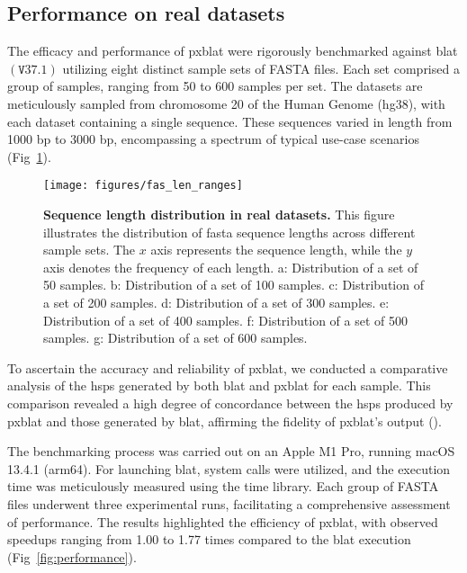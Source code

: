 \documentclass[10pt,letterpaper]{article}
\begin{document}
\subsection*{Performance on real datasets}

The efficacy and performance of \gls{pxblat} were rigorously benchmarked against \gls{blat} \(\left(\mathtt{V}37.1\right)\) utilizing eight distinct sample sets of FASTA files.
Each set comprised a group of samples, ranging from 50 to 600 samples per set.
The datasets are meticulously sampled from chromosome 20 of the Human Genome (hg38), with each dataset containing a single sequence.
These sequences varied in length from \num{1000} bp to \num{3000} bp, encompassing a spectrum of typical use-case scenarios (Fig~\ref{fig:fas_len}).

\begin{figure}[!h]
	\caption{{\bf Sequence length distribution in real datasets.} This figure illustrates the distribution of fasta sequence lengths across different sample sets. The \(x\) axis represents the sequence length, while the \(y\) axis denotes the frequency of each length.
        a: Distribution of a set of \num{50} samples.
        b: Distribution of a set of \num{100} samples.
        c: Distribution of a set of \num{200} samples.
        d: Distribution of a set of \num{300} samples.
        e: Distribution of a set of \num{400} samples.
        f: Distribution of a set of \num{500} samples.
        g: Distribution of a set of \num{600} samples.
        }
	\texttt{[image: figures/fas\_len\_ranges]}
	\label{fig:fas_len}
\end{figure}

To ascertain the accuracy and reliability of \gls{pxblat}, we conducted a comparative analysis of the \glspl{hsp} generated by both \gls{blat} and \gls{pxblat} for each sample.
This comparison revealed a high degree of concordance between the \glspl{hsp} produced by \gls{pxblat} and those generated by \gls{blat}, affirming the fidelity of \gls{pxblat}'s output ().

The benchmarking process was carried out on an Apple M1 Pro, running macOS 13.4.1 (arm64).
For launching \gls{blat}, system calls were utilized, and the execution time was meticulously measured using the time library.
Each group of FASTA files underwent three experimental runs, facilitating a comprehensive assessment of performance.
The results highlighted the efficiency of \gls{pxblat}, with observed speedups ranging from 1.00 to 1.77 times compared to the \gls{blat} execution (Fig~\ref{fig:performance}).
\end{document}
